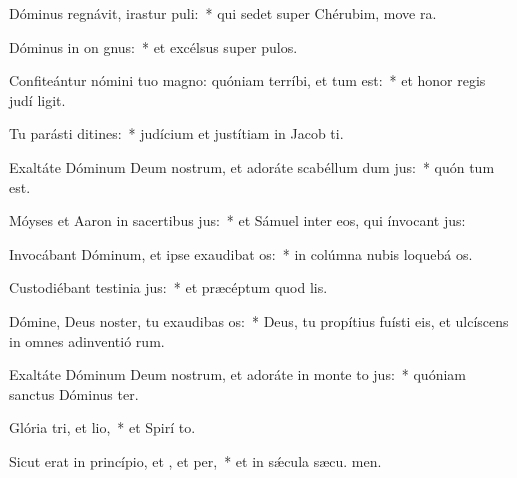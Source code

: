 \item Dóminus regnávit, irastur puli:~* qui sedet super Chérubim, move ra.
\item Dóminus in on gnus:~* et excélsus super  pulos.
\item Confiteántur nómini tuo magno: quóniam terríbi, et tum est:~* et honor regis judí ligit.
\item Tu parásti ditines:~* judícium et justítiam in Jacob  ti.
\item Exaltáte Dóminum Deum nostrum, et adoráte scabéllum dum jus:~* quón tum est.
\item Móyses et Aaron in sacertibus jus:~* et Sámuel inter eos, qui ínvocant  jus:
\item Invocábant Dóminum, et ipse exaudibat os:~* in colúmna nubis loquebá  os.
\item Custodiébant testinia jus:~* et præcéptum quod  lis.
\item Dómine, Deus noster, tu exaudibas os:~* Deus, tu propítius fuísti eis, et ulcíscens in omnes adinventió rum.
\item Exaltáte Dóminum Deum nostrum, et adoráte in monte to jus:~* quóniam sanctus Dóminus  ter.
\item Glória tri, et lio,~* et Spirí to.
\item Sicut erat in princípio, et , et per,~* et in sǽcula sæcu. men.
